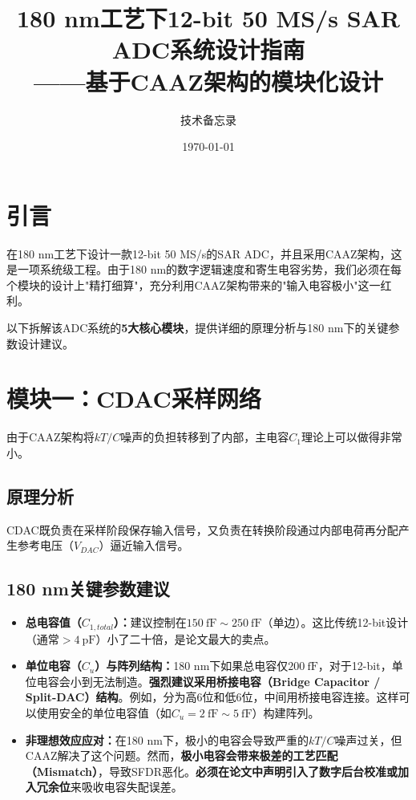 \documentclass[11pt,a4paper,UTF8]{ctexart}
\title{\textbf{180 nm工艺下12-bit 50 MS/s SAR ADC系统设计指南}\\[0.5em]
\large ——基于CAAZ架构的模块化设计}
\author{技术备忘录}
\date{\today}
\begin{document}
\maketitle

\section{引言}

在180 nm工艺下设计一款12-bit 50 MS/s的SAR ADC，并且采用CAAZ架构，这是一项系统级工程。由于180 nm的数字逻辑速度和寄生电容劣势，我们必须在每个模块的设计上"精打细算"，充分利用CAAZ架构带来的"输入电容极小"这一红利。

以下拆解该ADC系统的\textbf{5大核心模块}，提供详细的原理分析与180 nm下的关键参数设计建议。

\section{模块一：CDAC采样网络}

由于CAAZ架构将$kT/C$噪声的负担转移到了内部，主电容$C_1$理论上可以做得非常小。

\subsection{原理分析}

CDAC既负责在采样阶段保存输入信号，又负责在转换阶段通过内部电荷再分配产生参考电压（$V_{DAC}$）逼近输入信号。

\subsection{180 nm关键参数建议}

\begin{itemize}[leftmargin=*]
    \item \textbf{总电容值（$C_{1,total}$）：}建议控制在\textbf{$\SI{150}{\femto\farad} \sim \SI{250}{\femto\farad}$}（单边）。这比传统12-bit设计（通常$>\SI{4}{\pico\farad}$）小了二十倍，是论文最大的卖点。
    
    \item \textbf{单位电容（$C_u$）与阵列结构：}180 nm下如果总电容仅$\SI{200}{\femto\farad}$，对于12-bit，单位电容会小到无法制造。\textbf{强烈建议采用桥接电容（Bridge Capacitor / Split-DAC）结构}。例如，分为高6位和低6位，中间用桥接电容连接。这样可以使用安全的单位电容值（如$C_u = \SI{2}{\femto\farad} \sim \SI{5}{\femto\farad}$）构建阵列。
    
    \item \textbf{非理想效应应对：}在180 nm下，极小的电容会导致严重的$kT/C$噪声过关，但CAAZ解决了这个问题。然而，\textbf{极小电容会带来极差的工艺匹配（Mismatch）}，导致SFDR恶化。\textbf{必须在论文中声明引入了数字后台校准或加入冗余位}来吸收电容失配误差。
\end{itemize}
\end{document}
